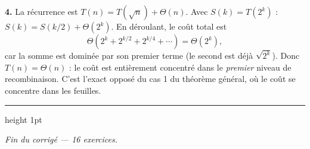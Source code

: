 \documentclass[11pt,a4paper]{article}
\begin{document}
\textbf{4.} La récurrence est $T(n)=T(\sqrt n)+\Theta(n)$. Avec $S(k)=T(2^{k})$ :
$S(k)=S(k/2)+\Theta(2^{k})$. En déroulant, le coût total est
\[
  \Theta\!\left(2^{k}+2^{k/2}+2^{k/4}+\cdots\right)
  = \Theta\!\left(2^{k}\right),
\]
car la somme est dominée par son premier terme (le second est déjà $\sqrt{2^k}$).
Donc $T(n)=\Theta(n)$ : le coût est entièrement concentré dans le \emph{premier}
niveau de recombinaison. C'est l'exact opposé du cas 1 du théorème général, où le coût
se concentre dans les feuilles.

\vspace{14pt}
{\color{teal}\hrule height 1pt}
\vspace{6pt}
\begin{center}
\small\itshape Fin du corrigé --- 16 exercices.
\end{center}
\end{document}
